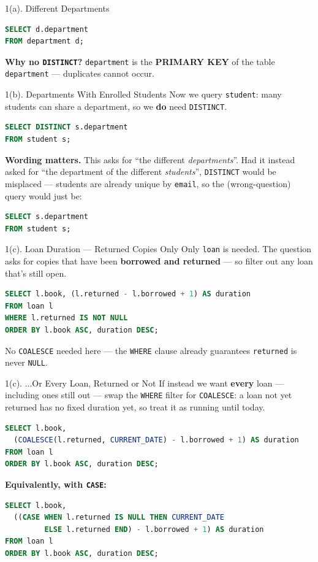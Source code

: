 \documentclass{beamer}
\begin{document}
\begin{frame}[fragile]{1(a). Different Departments}
\small
\begin{lstlisting}[language=SQL]
SELECT d.department
FROM department d;
\end{lstlisting}
\textbf{Why no \texttt{DISTINCT}?} \texttt{department} is the \textbf{PRIMARY KEY} of the table \texttt{department} --- duplicates cannot occur.
\end{frame}

\begin{frame}[fragile]{1(b). Departments With Enrolled Students}
\small
Now we query \texttt{student}: many students can share a department, so we \textbf{do} need \texttt{DISTINCT}.
\begin{lstlisting}[language=SQL]
SELECT DISTINCT s.department
FROM student s;
\end{lstlisting}
\textbf{Wording matters.} This asks for ``the different \emph{departments}''. Had it instead asked for ``the department of the different \emph{students}'', \texttt{DISTINCT} would be misplaced --- students are already unique by \texttt{email}, so the (wrong-question) query would just be:
\begin{lstlisting}[language=SQL]
SELECT s.department
FROM student s;
\end{lstlisting}
\end{frame}

\begin{frame}[fragile]{1(c). Loan Duration --- Returned Copies Only}
\small
Only \texttt{loan} is needed. The question asks for copies that have been \textbf{borrowed and returned} --- so filter out any loan that's still open.
\begin{lstlisting}[language=SQL]
SELECT l.book, (l.returned - l.borrowed + 1) AS duration
FROM loan l
WHERE l.returned IS NOT NULL
ORDER BY l.book ASC, duration DESC;
\end{lstlisting}
No \texttt{COALESCE} needed here --- the \texttt{WHERE} clause already guarantees \texttt{returned} is never \texttt{NULL}.
\end{frame}

\begin{frame}[fragile]{1(c). ...Or Every Loan, Returned or Not}
\small
If instead we want \textbf{every} loan --- including ones still out --- swap the \texttt{WHERE} filter for \texttt{COALESCE}: a loan not yet returned has no fixed duration yet, so treat it as running until today.
\begin{lstlisting}[language=SQL]
SELECT l.book,
  (COALESCE(l.returned, CURRENT_DATE) - l.borrowed + 1) AS duration
FROM loan l
ORDER BY l.book ASC, duration DESC;
\end{lstlisting}
\textbf{Equivalently, with \texttt{CASE}:}
\begin{lstlisting}[language=SQL]
SELECT l.book,
  ((CASE WHEN l.returned IS NULL THEN CURRENT_DATE
         ELSE l.returned END) - l.borrowed + 1) AS duration
FROM loan l
ORDER BY l.book ASC, duration DESC;
\end{lstlisting}
\end{frame}
\end{document}
